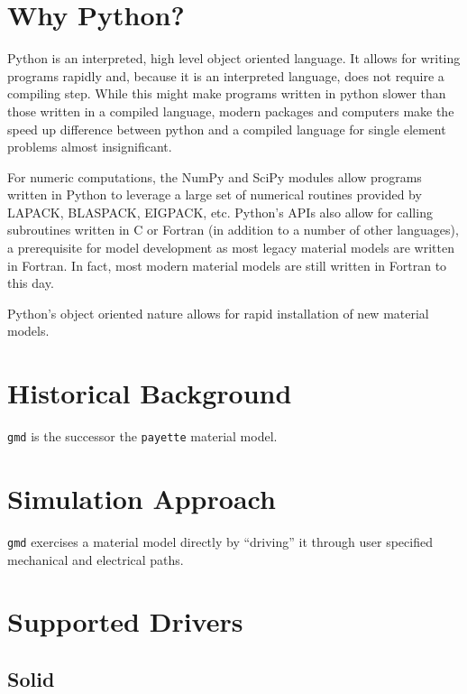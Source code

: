 \documentclass[11pt]{report}
\newcommand{\gmd}{\texttt{gmd}}
\begin{document}
\section{Why Python?}
Python is an interpreted, high level object oriented language. It allows for
writing programs rapidly and, because it is an interpreted language, does not
require a compiling step. While this might make programs written in python
slower than those written in a compiled language, modern packages and
computers make the speed up difference between python and a compiled language
for single element problems almost insignificant.

For numeric computations, the NumPy and SciPy modules allow programs written
in Python to leverage a large set of numerical routines provided by LAPACK,
BLASPACK, EIGPACK, etc. Python's APIs also allow for calling subroutines
written in C or Fortran (in addition to a number of other languages), a
prerequisite for model development as most legacy material models are written
in Fortran. In fact, most modern material models are still written in Fortran
to this day.

Python's object oriented nature allows for rapid installation of new material
models.

\section{Historical Background}
\gmd{} is the successor the \texttt{payette} material model.

\section{Simulation Approach}
\gmd{} exercises a material model directly by ``driving'' it through user
specified mechanical and electrical paths.

\section{Supported Drivers}

\subsection{Solid}
\end{document}

